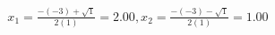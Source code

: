 \documentclass[preview]{standalone}
\begin{document}
\begin{align*}
x_1 = \frac{-(-3) + \sqrt{1}}{2(1)} = 2.00 , x_2 = \frac{-(-3) - \sqrt{1}}{2(1)} = 1.00
\end{align*}
\end{document}
